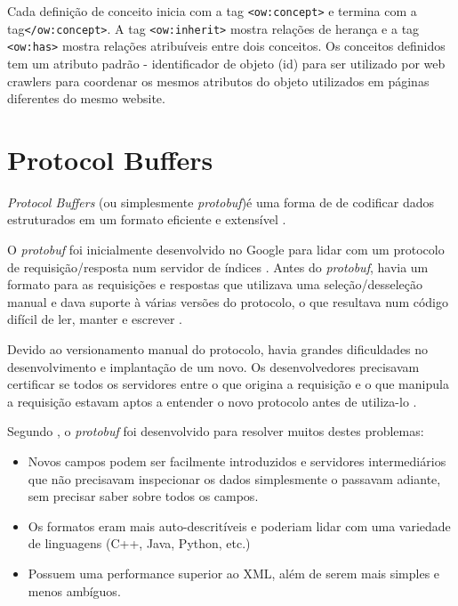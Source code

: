 Cada definição de conceito inicia com a tag \texttt{<ow:concept>} e termina com a tag\texttt{</ow:concept>}. A tag \texttt{<ow:inherit>} mostra relações de herança e a tag \texttt{<ow:has>} mostra relações atribuíveis entre dois conceitos. Os conceitos definidos tem um atributo padrão - identificador de objeto (id) para ser utilizado por web crawlers para coordenar os mesmos atributos do objeto utilizados em páginas diferentes do mesmo website.

\pagebreak
\section{Protocol Buffers}

\emph{Protocol Buffers} (ou simplesmente \emph{protobuf})é uma forma de de codificar dados estruturados em um formato eficiente e extensível \cite{protobuf}. 

O \emph{protobuf} foi inicialmente desenvolvido no Google para lidar com um protocolo de requisição/resposta num servidor de índices \cite{protobuf_overview}. Antes do \emph{protobuf}, havia um formato para as requisições e respostas que utilizava uma seleção/desseleção manual e dava suporte à várias versões do protocolo, o que resultava num código difícil de ler, manter e escrever \cite{protobuf_overview} . 

Devido ao versionamento manual do protocolo, havia grandes dificuldades no desenvolvimento e implantação de um novo. Os desenvolvedores precisavam certificar se todos os servidores entre o que origina a requisição e o que manipula a requisição estavam aptos a entender o novo protocolo antes de utiliza-lo \cite{protobuf_overview}.

Segundo \cite{protobuf_overview}, o \emph{protobuf} foi desenvolvido para resolver muitos destes problemas:

\begin{itemize}
	\item Novos campos podem ser facilmente introduzidos e servidores intermediários que não precisavam inspecionar os dados simplesmente o passavam adiante, sem precisar saber sobre todos os campos.
	\item Os formatos eram mais auto-descritíveis e poderiam lidar com uma variedade de linguagens (C++, Java, Python, etc.)
	\item Possuem uma performance superior ao XML, além de serem mais simples e menos ambíguos.
\end{itemize}

